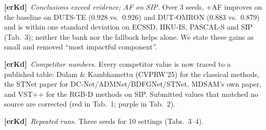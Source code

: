 \documentclass[10pt,twocolumn,letterpaper]{article}
\newcommand{\rK}{\textbf{[erKd]}}
\begin{document}
\rK\ \emph{Conclusions exceed evidence; AF on SIP.} Over 3 seeds, +AF improves on
the baseline on DUTS-TE ($0.928$ vs.\ $0.926$) and DUT-OMRON ($0.883$ vs.\ $0.879$)
and is within one standard deviation on ECSSD, HKU-IS, PASCAL-S and SIP (Tab.~3);
neither the bank nor the fallback helps alone. We state these gains as small and
removed ``most impactful component''.

\rK\ \emph{Competitor numbers.} Every competitor value is now traced to a published
table: Dulam \& Kambhamettu (CVPRW'25) for the classical methods, the STNet paper
for DC-Net/ADMNet/BDFGNet/STNet, MDSAM's own paper, and VST++ for the RGB-D methods
on SIP. Submitted values that matched no source are corrected (red in Tab.~1;
purple in Tab.~2).

\rK\ \emph{Repeated runs.} Three seeds for 10 settings (Tabs.~3--4).
\end{document}
